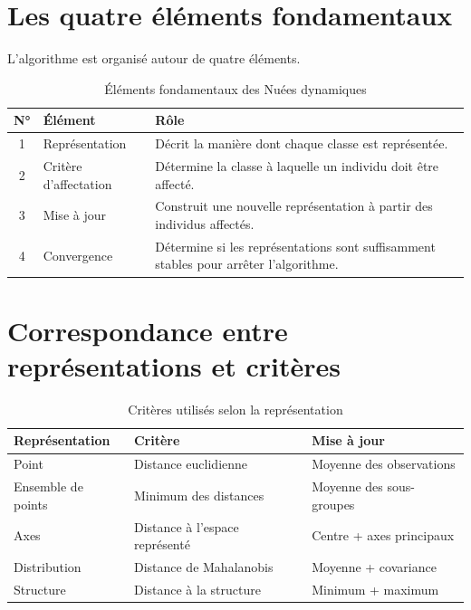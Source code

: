 \documentclass[12pt,a4paper]{report}
\begin{document}
\section{Les quatre éléments fondamentaux}

L'algorithme est organisé autour de quatre éléments.

\begin{table}[H]
\centering
\caption{Éléments fondamentaux des Nuées dynamiques}
\label{tab:elements}
\begin{tabular}{|c|l|p{8cm}|}
\hline
\textbf{N°} & \textbf{Élément} & \textbf{Rôle} \\
\hline
1 & Représentation &
Décrit la manière dont chaque classe est représentée. \\
\hline
2 & Critère d'affectation &
Détermine la classe à laquelle un individu doit être affecté. \\
\hline
3 & Mise à jour &
Construit une nouvelle représentation à partir des individus affectés. \\
\hline
4 & Convergence &
Détermine si les représentations sont suffisamment stables pour arrêter l'algorithme. \\
\hline
\end{tabular}
\end{table}

\section{Correspondance entre représentations et critères}

\begin{table}[H]
\centering
\caption{Critères utilisés selon la représentation}
\label{tab:criteres}
\begin{tabular}{|l|l|l|}
\hline
\textbf{Représentation} & \textbf{Critère} & \textbf{Mise à jour} \\
\hline
Point & Distance euclidienne & Moyenne des observations \\
\hline
Ensemble de points & Minimum des distances & Moyenne des sous-groupes \\
\hline
Axes & Distance à l'espace représenté & Centre + axes principaux \\
\hline
Distribution & Distance de Mahalanobis & Moyenne + covariance \\
\hline
Structure & Distance à la structure & Minimum + maximum \\
\hline
\end{tabular}
\end{table}
\end{document}
